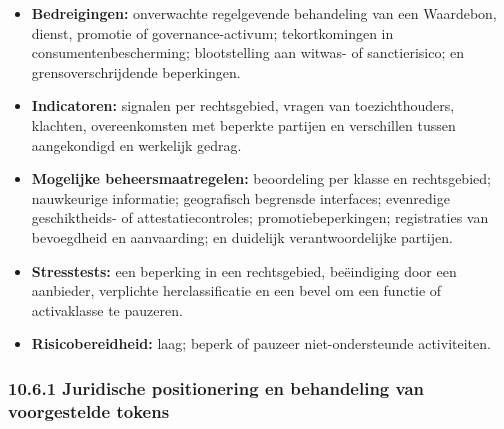\documentclass[11pt]{article}
\begin{document}
\begin{itemize}[leftmargin=*]
\item \textbf{Bedreigingen:} onverwachte regelgevende behandeling van een Waardebon, dienst, promotie of governance-activum; tekortkomingen in consumentenbescherming; blootstelling aan witwas- of sanctierisico; en grensoverschrijdende beperkingen.
\item \textbf{Indicatoren:} signalen per rechtsgebied, vragen van toezichthouders, klachten, overeenkomsten met beperkte partijen en verschillen tussen aangekondigd en werkelijk gedrag.
\item \textbf{Mogelijke beheersmaatregelen:} beoordeling per klasse en rechtsgebied; nauwkeurige informatie; geografisch begrensde interfaces; evenredige geschiktheids- of attestatiecontroles; promotiebeperkingen; registraties van bevoegdheid en aanvaarding; en duidelijk verantwoordelijke partijen.
\item \textbf{Stresstests:} een beperking in een rechtsgebied, beëindiging door een aanbieder, verplichte herclassificatie en een bevel om een functie of activaklasse te pauzeren.
\item \textbf{Risicobereidheid:} laag; beperk of pauzeer niet-ondersteunde activiteiten.
\end{itemize}
\subsubsection*{10.6.1 Juridische positionering en behandeling van voorgestelde tokens}
\end{document}
